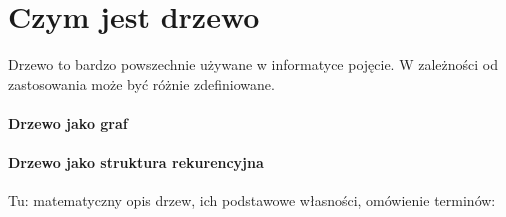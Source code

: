 \section{Czym jest drzewo}
Drzewo to bardzo powszechnie używane w informatyce pojęcie. W zależności od zastosowania może być różnie zdefiniowane.

\paragraph{Drzewo jako graf}
\paragraph{Drzewo jako struktura rekurencyjna}


Tu: matematyczny opis drzew, ich podstawowe własności, omówienie terminów:
